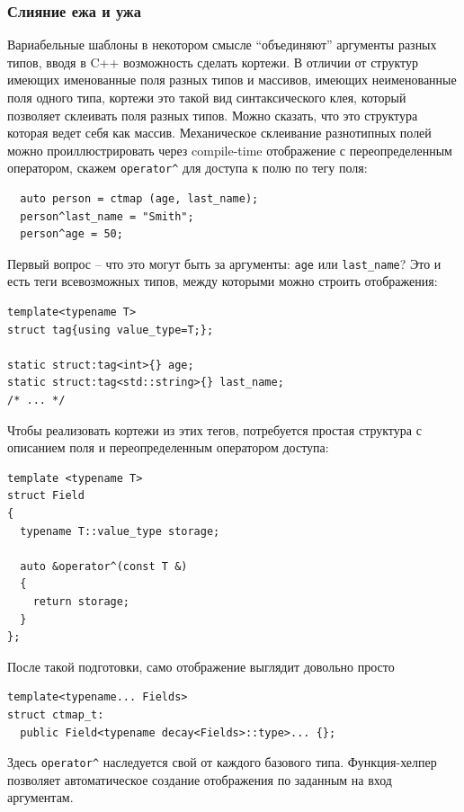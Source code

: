 \documentclass[a4paper,12pt,oneside]{article}
\begin{document}
\subsubsection{Слияние ежа и ужа}

Вариабельные шаблоны в некотором смысле ``объединяют'' аргументы разных типов, вводя в C++ возможность сделать кортежи. В отличии от структур имеющих именованные поля разных типов и массивов, имеющих неименованные поля одного типа, кортежи это такой вид синтаксического клея, который позволяет склеивать поля разных типов. Можно сказать, что это структура которая ведет себя как массив. Механическое склеивание разнотипных полей можно проиллюстрировать через compile-time отображение с переопределенным оператором, скажем \lstinline!operator^! для доступа к полю по тегу поля:

\begin{lstlisting}
  auto person = ctmap (age, last_name);
  person^last_name = "Smith";
  person^age = 50;
\end{lstlisting}

Первый вопрос -- что это могут быть за аргументы: \lstinline!age! или \lstinline!last_name!? Это и есть теги всевозможных типов, между которыми можно строить отображения:

\begin{lstlisting}
template<typename T>
struct tag{using value_type=T;};

static struct:tag<int>{} age;
static struct:tag<std::string>{} last_name;
/* ... */
\end{lstlisting}

Чтобы реализовать кортежи из этих тегов, потребуется простая структура с описанием поля и переопределенным оператором доступа:

\begin{lstlisting}
template <typename T>
struct Field 
{
  typename T::value_type storage;

  auto &operator^(const T &) 
  {
    return storage;
  }
};
\end{lstlisting}

После такой подготовки, само отображение выглядит довольно просто

\begin{lstlisting}
template<typename... Fields>
struct ctmap_t: 
  public Field<typename decay<Fields>::type>... {};
\end{lstlisting}

Здесь \lstinline!operator^! наследуется свой от каждого базового типа. Функция-хелпер позволяет автоматическое создание отображения по заданным на вход аргументам.
\end{document}
